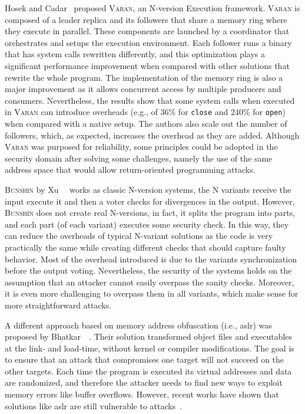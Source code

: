 Hosek and Cadar~\cite{Hosek:2015} proposed \textsc{Varan}, an N-version Execution framework.
\textsc{Varan} is composed of a leader replica and its followers that share a memory ring where they execute in parallel.
These components are launched by a coordinator that orchestrates and setups the execution environment.
Each follower runs a binary that has system calls rewritten differently, and this optimization plays a significant performance improvement when compared with other solutions that rewrite the whole program.
The implementation of the memory ring is also a major improvement as it allows concurrent access by multiple producers and consumers.
Nevertheless, the results show that some system calls when executed in \textsc{Varan} can introduce overheads (e.g., of 36\% for \texttt{close} and 240\% for \texttt{open}) when compared with a native setup.
The authors also scale out the number of followers, which, as expected, increases the overhead as they are added. 
Although \textsc{Varan} was purposed for reliability, some principles could be adopted in the security domain after solving some challenges, namely the use of the same address space that would allow return-oriented programming attacks.

\textsc{Bunshin} by Xu~\etal{}~\cite{Xu:2017c} works as classic N-version systems, the N variants receive the input execute it and then a voter checks for divergences in the output.
However, \textsc{Bunshin} does not create real N-versions, in fact, it splits the program into parts, and each part (of each variant) executes some security check. 
In this way, they can reduce the overheads of typical N-variant solutions as the code is very practically the same while creating different checks that should capture faulty behavior.
Most of the overhead introduced is due to the variants synchronization before the output voting.
Nevertheless, the security of the systems holds on the assumption that an attacker cannot easily overpass the sanity checks.
Moreover, it is even more challenging to overpass them in all variants, which make sense for more straightforward attacks.


A different approach based on memory address obfuscation (i.e., \gls{aslr}) was proposed by Bhatkar~\etal{}~\cite{Bhatkar:2003}.
Their solution transformed object files and executables at the link- and load-time, without kernel or compiler modifications. 
The goal is to ensure that an attack that compromises one target will not succeed on the other targets. 
Each time the program is executed its virtual addresses and data are randomized, and therefore the attacker needs to find new ways to exploit memory errors like buffer overflows. 
However, recent works have shown that solutions like \gls{aslr} are still vulnerable to attacks~\cite{Bittau:2014,Jang:2016,Snow:2013,vanderVeen:2017}.

